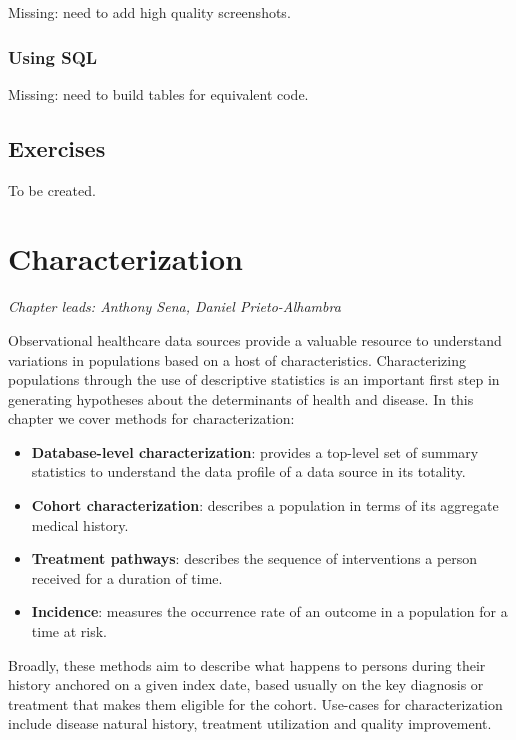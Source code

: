 \documentclass[11pt]{book}
\providecommand{\tightlist}{%
  \setlength{\itemsep}{0pt}\setlength{\parskip}{0pt}}
\theoremstyle{definition}
\theoremstyle{definition}
\theoremstyle{definition}
\theoremstyle{remark}
\begin{document}
Missing: need to add high quality screenshots.

\hypertarget{using-sql}{%
\subsection{Using SQL}\label{using-sql}}

Missing: need to build tables for equivalent code.

\hypertarget{exercises-3}{%
\section{Exercises}\label{exercises-3}}

To be created.

\hypertarget{Characterization}{%
\chapter{Characterization}\label{Characterization}}

\emph{Chapter leads: Anthony Sena, Daniel Prieto-Alhambra}

Observational healthcare data sources provide a valuable resource to understand variations in populations based on a host of characteristics. Characterizing populations through the use of descriptive statistics is an important first step in generating hypotheses about the determinants of health and disease. In this chapter we cover methods for characterization:

\begin{itemize}
\tightlist
\item
  \textbf{Database-level characterization}: provides a top-level set of summary statistics to understand the data profile of a data source in its totality.
\item
  \textbf{Cohort characterization}: describes a population in terms of its aggregate medical history.
\item
  \textbf{Treatment pathways}: describes the sequence of interventions a person received for a duration of time.
\item
  \textbf{Incidence}: measures the occurrence rate of an outcome in a population for a time at risk.
\end{itemize}

Broadly, these methods aim to describe what happens to persons during their history anchored on a given index date, based usually on the key diagnosis or treatment that makes them eligible for the cohort. Use-cases for characterization include disease natural history, treatment utilization and quality improvement.
\end{document}
